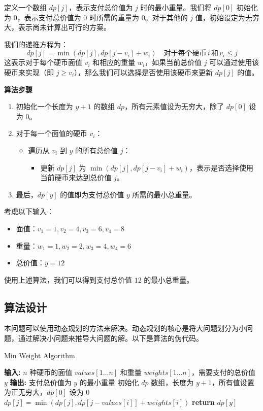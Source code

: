 \documentclass[12pt]{article}
\begin{document}
定义一个数组 $dp[j]$，表示支付总价值为 $j$ 时的最小重量。我们将 $dp[0]$ 初始化为 $0$，表示支付总价值为 $0$ 时所需的重量为 $0$。对于其他的 $j$ 值，初始设定为无穷大，表示尚未计算出可行的方案。

我们的递推方程为：
\[
dp[j] = \min \left( dp[j], dp[j - v_i] + w_i \right) \quad \text{对于每个硬币} \,i\, \text{和}\,  v_i \leq j
\]
这表示对于每个硬币面值 $v_i$ 和相应的重量 $w_i$，如果当前总价值 $j$ 可以通过使用该硬币来实现（即 $j \geq v_i$），那么我们可以选择是否使用该硬币来更新 $dp[j]$ 的值。


\textbf{算法步骤}

\begin{enumerate}
    \item 初始化一个长度为 $y+1$ 的数组 $dp$，所有元素值设为无穷大，除了 $dp[0]$ 设为 0。
    \item 对于每一个面值的硬币 $v_i$：
    \begin{itemize}
        \item 遍历从 $v_i$ 到 $y$ 的所有总价值 $j$：
        \begin{itemize}
            \item 更新 $dp[j]$ 为 $ \min(dp[j], dp[j - v_i] + w_i)$，表示是否选择使用当前硬币来达到总价值 $j$。
        \end{itemize}
    \end{itemize}
    \item 最后，$dp[y]$ 的值即为支付总价值 $y$ 所需的最小总重量。
\end{enumerate}



考虑以下输入：
\begin{itemize}
    \item 面值：$v_1=1, v_2=4, v_3=6, v_4=8$
    \item 重量：$w_1=1, w_2=2, w_3=4, w_4=6$
    \item 总价值：$y=12$
\end{itemize}
使用上述算法，我们可以得到支付总价值 $12$ 的最小总重量。



\subsection{算法设计}
本问题可以使用动态规划的方法来解决。动态规划的核心是将大问题划分为小问题，通过解决小问题来推导大问题的解。以下是算法的伪代码。

\begin{algorithm}[H]
\caption{Min Weight Algorithm}
\begin{algorithmic}[1]
\STATE \textbf{输入:} $n$ 种硬币的面值 $values[1 \ldots n]$ 和重量 $weights[1 \ldots n]$，需要支付的总价值 $y$
\STATE \textbf{输出:} 支付总价值为 $y$ 的最小重量
\STATE 初始化 $dp$ 数组，长度为 $y+1$，所有值设置为正无穷大，$dp[0]$ 设为 0
        \STATE $dp[j] = \min(dp[j], dp[j - values[i]] + weights[i])$
    \ENDFOR
\ENDFOR
\STATE \textbf{return} $dp[y]$
\end{algorithmic}
\end{algorithm}
\end{document}
